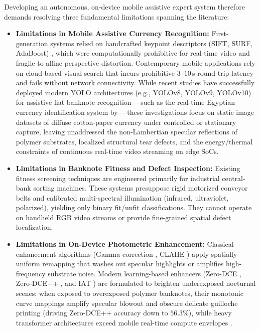 \documentclass[final,5p,times,twocolumn,authoryear]{elsarticle}
\begin{document}
Developing an autonomous, on-device mobile assistive expert system therefore demands resolving three fundamental limitations spanning the literature:
\begin{itemize}
    \item \textbf{Limitations in Mobile Assistive Currency Recognition:} First-generation systems relied on handcrafted keypoint descriptors (SIFT, SURF, AdaBoost) \cite{Hasanuzzaman2012,Dunai2017}, which were computationally prohibitive for real-time video and fragile to affine perspective distortion. Contemporary mobile applications rely on cloud-based visual search \cite{TapTapSee,Kacorri2017} that incurs prohibitive $3$--$10$\,s round-trip latency and fails without network connectivity. While recent studies have successfully deployed modern YOLO architectures (e.g., YOLOv8, YOLOv9, YOLOv10) for assistive fiat banknote recognition \cite{tasnim2021,Ghanem2025}---such as the real-time Egyptian currency identification system by \citet{Ghanem2025}---these investigations focus on static image datasets of diffuse cotton-paper currency under controlled or stationary capture, leaving unaddressed the non-Lambertian specular reflections of polymer substrates, localized structural tear defects, and the energy/thermal constraints of continuous real-time video streaming on edge SoCs.
    \item \textbf{Limitations in Banknote Fitness and Defect Inspection:} Existing fitness screening techniques \cite{Ahmadi2004,Lee2017,Gai2013,Pham2018,saini2022,park2023} are engineered primarily for industrial central-bank sorting machines. These systems presuppose rigid motorized conveyor belts and calibrated multi-spectral illumination (infrared, ultraviolet, polarized), yielding only binary fit/unfit classifications. They cannot operate on handheld RGB video streams or provide fine-grained spatial defect localization.
    \item \textbf{Limitations in On-Device Photometric Enhancement:} Classical enhancement algorithms (Gamma correction \cite{Gonzalez2008}, CLAHE \cite{Zuiderveld1994}) apply spatially uniform remapping that washes out specular highlights or amplifies high-frequency substrate noise. Modern learning-based enhancers (Zero-DCE \cite{Guo2020}, Zero-DCE++ \cite{Li2021}, and IAT \cite{Cui2022}) are formulated to brighten underexposed nocturnal scenes; when exposed to overexposed polymer banknotes, their monotonic curve mappings amplify specular blowout and obscure delicate guilloche printing (driving Zero-DCE++ accuracy down to $56.3\%$), while heavy transformer architectures \cite{Cui2022,Cai2023} exceed mobile real-time compute envelopes \cite{Huang2022,Li2022}.
\end{itemize}
\end{document}
